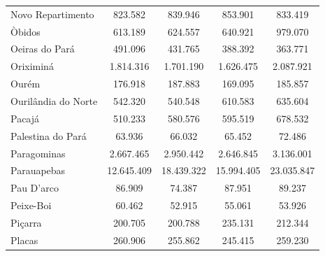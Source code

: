 \begin{table}[!htb]
{\begin{tabular}{l|c|c|c|c}
   Novo Repartimento      &  823.582   &  839.946   & 853.901    & 833.419      \\
   Òbidos                 &  613.189   &  624.557   & 640.921    & 979.070      \\
   Oeiras do Pará         &  491.096   &  431.765   & 388.392    &  363.771     \\
   Oriximiná              &  1.814.316 &  1.701.190 & 1.626.475  &  2.087.921    \\
   Ourém                  &  176.918   &  187.883   & 169.095    & 185.857       \\
   Ourilândia do Norte    & 542.320    &  540.548   & 610.583    & 635.604       \\
   Pacajá                 & 510.233    &  580.576   & 595.519    & 678.532       \\
   Palestina do Pará      & 63.936     &  66.032    & 65.452     & 72.486        \\
   Paragominas            & 2.667.465  &  2.950.442 & 2.646.845  & 3.136.001      \\
   Parauapebas            & 12.645.409 &  18.439.322 & 15.994.405 &  23.035.847   \\
   Pau D'arco             & 86.909     &   74.387    &  87.951    & 89.237        \\
   Peixe-Boi              & 60.462     &   52.915    &  55.061    & 53.926   \\
   Piçarra                & 200.705    &   200.788   & 235.131    & 212.344   \\
   Placas                 & 260.906    &   255.862   &  245.415   & 259.230   \\
\end{tabular}}
\end{table}


